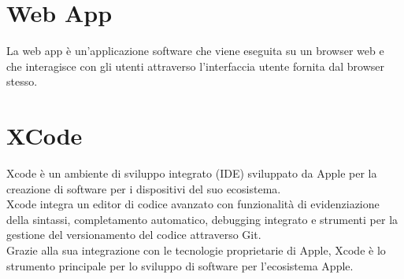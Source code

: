 \documentclass{article}
\begin{document}
\section{Web App}
 La web app è un'applicazione software che viene eseguita su un browser web e che interagisce con gli utenti attraverso l'interfaccia utente fornita dal browser stesso.

 \section{XCode}
 Xcode è un ambiente di sviluppo integrato (IDE) sviluppato da Apple per la creazione di software per i dispositivi del suo ecosistema.\\
 Xcode integra un editor di codice avanzato con funzionalità di evidenziazione della sintassi, completamento automatico, debugging integrato e strumenti per la gestione del versionamento del codice attraverso Git.\\
 Grazie alla sua integrazione con le tecnologie proprietarie di Apple, Xcode è lo strumento principale per lo sviluppo di software per l'ecosistema Apple.
 
\end{document}
